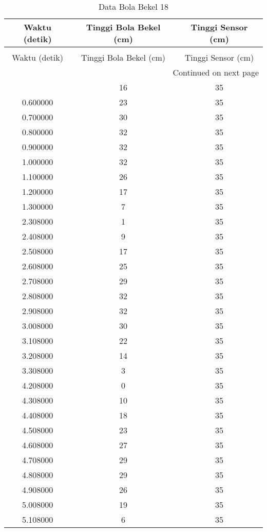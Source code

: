 \begin{longtable}[htbp]{|c|c|c|}
\caption{Data Bola Bekel 18} \\
\hline
Waktu (detik) & Tinggi Bola Bekel (cm) & Tinggi Sensor (cm) \\ \hline
\endfirsthead
\caption[]{Data Bola Bekel 18} \\
\hline
Waktu (detik) & Tinggi Bola Bekel (cm) & Tinggi Sensor (cm) \\ \hline
\endhead
\multicolumn{3}{r}{Continued on next page} \\
\endfoot
\endlastfoot
0.500000 & 16 & 35 \\ \hline
0.600000 & 23 & 35 \\ \hline
0.700000 & 30 & 35 \\ \hline
0.800000 & 32 & 35 \\ \hline
0.900000 & 32 & 35 \\ \hline
1.000000 & 32 & 35 \\ \hline
1.100000 & 26 & 35 \\ \hline
1.200000 & 17 & 35 \\ \hline
1.300000 & 7 & 35 \\ \hline
2.308000 & 1 & 35 \\ \hline
2.408000 & 9 & 35 \\ \hline
2.508000 & 17 & 35 \\ \hline
2.608000 & 25 & 35 \\ \hline
2.708000 & 29 & 35 \\ \hline
2.808000 & 32 & 35 \\ \hline
2.908000 & 32 & 35 \\ \hline
3.008000 & 30 & 35 \\ \hline
3.108000 & 22 & 35 \\ \hline
3.208000 & 14 & 35 \\ \hline
3.308000 & 3 & 35 \\ \hline
4.208000 & 0 & 35 \\ \hline
4.308000 & 10 & 35 \\ \hline
4.408000 & 18 & 35 \\ \hline
4.508000 & 23 & 35 \\ \hline
4.608000 & 27 & 35 \\ \hline
4.708000 & 29 & 35 \\ \hline
4.808000 & 29 & 35 \\ \hline
4.908000 & 26 & 35 \\ \hline
5.008000 & 19 & 35 \\ \hline
5.108000 & 6 & 35 \\ \hline

\end{longtable}
